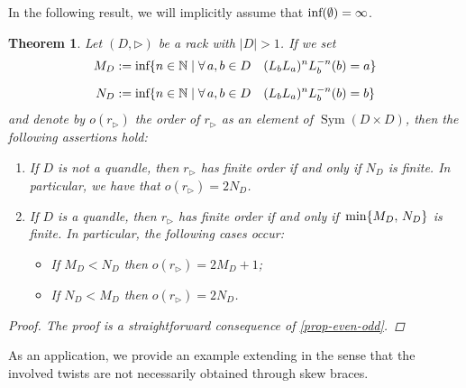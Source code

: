 \documentclass[preprint,1p]{elsarticle}
\numberwithin{equation}{section}
\newtheorem{theor}{Theorem}[section]
\theoremstyle{definition}               %
\newcommand{\tr}{\triangleright}
\DeclareMathOperator{\Sym}{Sym}
\begin{document}
In the following result, we will implicitly assume that $\textnormal{inf}(\emptyset) = \infty$.

\begin{theor}\label{theor:derived_sol_order}
    Let $(D,\tr)$ be a rack with $|D| > 1$. 
    If we set
    \begin{align*}
        M_D &:= \textnormal{inf}\{n \in \mathbb{N} \mid \forall\, a,b\in D \quad (L_bL_a)^nL_b^{-n}(b) = a\} \\[0.2cm]
        N_D &:= \textnormal{inf}\{n \in \mathbb{N} \mid \forall\, a,b\in D \quad (L_bL_a)^nL_b^{-n}(b) = b\}
    \end{align*}
    and denote by $o(r_\tr)$ the order of $r_\tr$ as an element of $\Sym(D \times D)$, then the following assertions hold:
    \begin{enumerate}
        \item[\textnormal{1)}] If $D$ is not a quandle, then $r_\tr$ has finite order if and only if $N_D$ is finite.
        In particular, we have that $o(r_\tr) = 2N_D$.
        \item[\textnormal{2)}] If $D$ is a quandle, then $r_\tr$ has finite order if and only if\, $\textnormal{min}\{M_D,\,N_D\}$ is finite.
        In particular, the following cases occur:
        \begin{itemize}
            \item[\textnormal{(a)}] If $M_D < N_D$ then $o(r_\tr) = 2M_D+1$;
            \item[\textnormal{(b)}] %
            If $N_D < M_D$ then $o(r_\tr) = 2N_D$.
        \end{itemize}
    \end{enumerate}
    \begin{proof}
        The proof is a straightforward consequence of \cref{prop-even-odd}.
    \end{proof}
\end{theor}

\smallskip

As an application, we provide an example extending \cite[Theorem~4.13]{SmVe18} in the sense that the involved twists are not necessarily obtained through skew braces.
\end{document}
